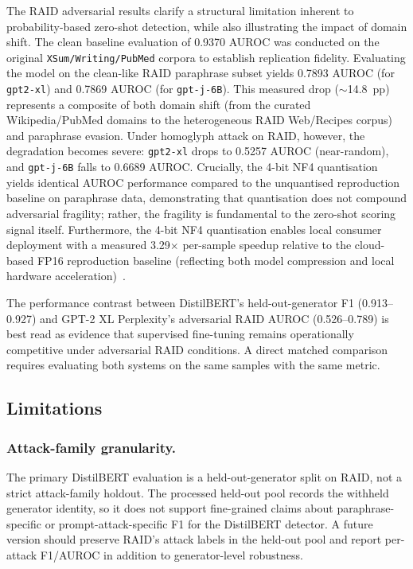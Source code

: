 \documentclass[conference]{IEEEtran}
\begin{document}
The RAID adversarial results clarify a structural limitation inherent to probability-based 
zero-shot detection, while also illustrating the impact of domain shift. The clean 
baseline evaluation of 0.9370 AUROC was conducted on the original \texttt{XSum/Writing/PubMed} 
corpora to establish replication fidelity. Evaluating the model on the clean-like RAID 
paraphrase subset yields 0.7893 AUROC (for \texttt{gpt2-xl}) and 0.7869 AUROC (for \texttt{gpt-j-6B}). 
This measured drop ($\sim$14.8~pp) represents a composite of both domain shift (from the 
curated Wikipedia/PubMed domains to the heterogeneous RAID Web/Recipes corpus) and paraphrase 
evasion. Under homoglyph attack on RAID, however, the degradation becomes severe: \texttt{gpt2-xl} 
drops to 0.5257 AUROC (near-random), and \texttt{gpt-j-6B} falls to 0.6689 AUROC. Crucially, 
the 4-bit NF4 quantisation yields identical AUROC performance compared to the unquantised 
reproduction baseline on paraphrase data, demonstrating that quantisation does not compound 
adversarial fragility; rather, the fragility is fundamental to the zero-shot scoring signal 
itself. Furthermore, the 4-bit NF4 quantisation enables local consumer deployment with a 
measured 3.29$\times$ per-sample speedup relative to the cloud-based FP16 reproduction baseline 
(reflecting both model compression and local hardware acceleration)~\cite{dettmers2023}.

The performance contrast between DistilBERT's held-out-generator F1
(0.913--0.927) and GPT-2 XL Perplexity's adversarial RAID AUROC (0.526--0.789)
is best read as evidence that supervised fine-tuning remains operationally
competitive under adversarial RAID conditions. A direct matched comparison
requires evaluating both systems on the same samples with the same metric.

\subsection{Limitations}\label{ssec:limits}

\subsubsection{Attack-family granularity.} The primary DistilBERT evaluation is a
held-out-generator split on RAID, not a strict attack-family holdout. The
processed held-out pool records the withheld generator identity, so it does not
support fine-grained claims about paraphrase-specific or prompt-attack-specific
F1 for the DistilBERT detector. A future version should preserve RAID's attack
labels in the held-out pool and report per-attack F1/AUROC in addition to
generator-level robustness.
\end{document}
